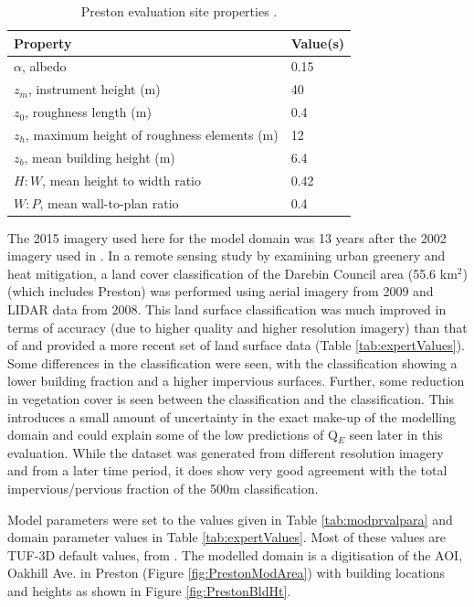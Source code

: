 \documentclass[final,3p,times,authoryear]{elsarticle}
\begin{document}
\begin{table}[!htbp]
\caption{Preston evaluation site properties \citep{Coutts2007}. \label{tab:prvalpara}}     
\begin{tabular}{| l | l |}
\hline
\textbf{Property} & \textbf{Value(s)} \\ \hline
$\alpha$, albedo & 0.15  \\ \hline
$z_{m}$, instrument height (m)&  40  \\ \hline
$z_{0}$, roughness length (m)& 0.4  \\ \hline
$z_{h}$, maximum height of roughness elements (m)& 12  \\ \hline
$z_{b}$, mean building height (m)& 6.4  \\ \hline
$H:W$, mean height to width ratio& 0.42  \\ \hline
$W:P$, mean wall-to-plan ratio &0.4  \\ \hline
\end{tabular}
\end{table}

The 2015 imagery used here for the model domain was 13 years after the 2002 imagery used in \cite{Coutts2007}. In a remote sensing study by \cite{Nury2015} examining urban greenery and heat mitigation, a land cover classification of the Darebin Council area (55.6 km$^{2}$) (which includes Preston) was performed using aerial imagery from 2009 and LIDAR data from 2008. This land surface classification was much improved in terms of accuracy (due to higher quality and higher resolution imagery) than that of \cite{Coutts2007} and provided a more recent set of land surface data (Table \ref{tab:expertValues}). Some differences in the classification were seen, with the \cite{Nury2015} classification showing a lower building fraction and a higher impervious surfaces. Further, some reduction in vegetation cover is seen between the \cite{Coutts2007} classification and the \cite{Nury2015} classification. This introduces a small amount of uncertainty in the exact make-up of the modelling domain and could explain some of the low predictions of Q$_{E}$ seen later in this evaluation. While the \cite{Nury2015} dataset was generated from different resolution imagery and from a later time period, it does show very good agreement with the total impervious/pervious fraction of the 500m classification.


Model parameters were set to the values given in Table \ref{tab:modprvalpara} and domain parameter values in Table \ref{tab:expertValues}. Most of these values are TUF-3D default values, from \cite{Krayenhoff2007}. The modelled domain is a digitisation of the AOI, Oakhill Ave. in Preston (Figure \ref{fig:PrestonModArea}) with building locations and heights as shown in Figure \ref{fig:PrestonBldHt}.
\end{document}
